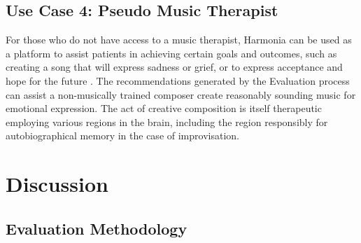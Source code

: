 \documentclass[final,authoryear,5p,times,twocolumn]{elsarticle}
\begin{document}
\subsection{Use Case 4: Pseudo Music Therapist}

For those who do not have access to a music therapist, Harmonia can be used as a platform to assist patients in achieving certain goals and outcomes, such as creating a song that will express sadness or grief, or to express acceptance and hope for the future \citep{dalton2006grief}. The recommendations generated by the Evaluation process can assist a non-musically trained composer create reasonably sounding music for emotional expression. The act of creative composition is itself therapeutic employing various regions in the brain, including the region responsibly for autobiographical memory in the case of improvisation. \citep{hilliard2001effects,bensimon2008drumming,limb2008neural,carr2012group} 

\section{Discussion}

\subsection{Evaluation Methodology}




\end{document}
